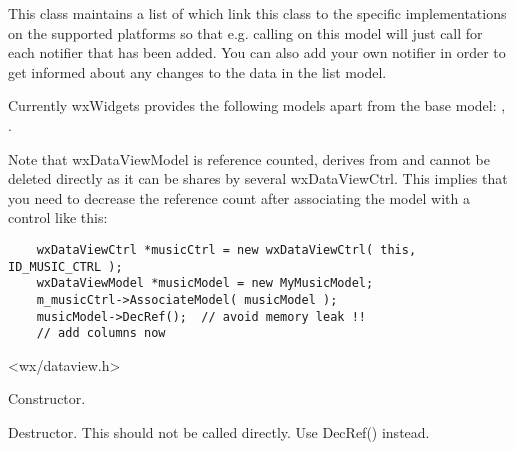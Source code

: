 This class maintains a list of 
which link this class to the specific implementations on the
supported platforms so that e.g. calling 
on this model will just call 
for each notifier that has been added. You can also add 
your own notifier in order to get informed about any changes 
to the data in the list model.

Currently wxWidgets provides the following models apart
from the base model: 
,
.

Note that wxDataViewModel is reference counted, derives from 
 and cannot be deleted
directly as it can be shares by several wxDataViewCtrl. This
implies that you need to decrease the reference count after
associating the model with a control like this:

{\small%
\begin{verbatim}
    wxDataViewCtrl *musicCtrl = new wxDataViewCtrl( this, ID_MUSIC_CTRL );
    wxDataViewModel *musicModel = new MyMusicModel;
    m_musicCtrl->AssociateModel( musicModel );
    musicModel->DecRef();  // avoid memory leak !!
    // add columns now
\end{verbatim}
}%




<wx/dataview.h>






\label{wxdataviewmodelwxdataviewmodel}


Constructor.

\label{wxdataviewmodeldtor}


Destructor. This should not be called directly. Use DecRef() instead.



